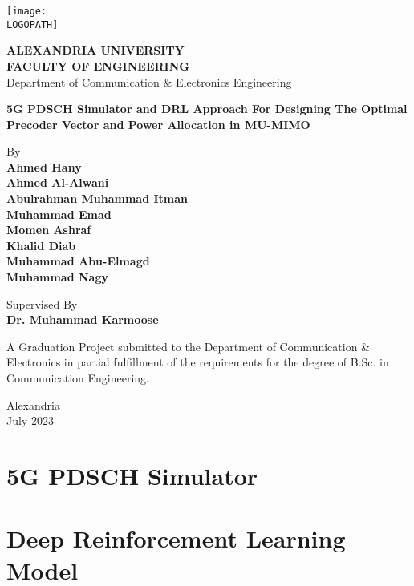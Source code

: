 \documentclass[12pt, a4paper, oneside]{book}
\def \LOGOPATH {au-logo1}
\def \UNIVERSITY {ALEXANDRIA UNIVERSITY}
\def \FACULTY {FACULTY OF ENGINEERING}
\def \DEPARTMENT {Department of Communication \& Electronics Engineering}
\def \PROJECTTITLE {5G PDSCH Simulator and DRL Approach For Designing The Optimal Precoder Vector and Power Allocation in MU-MIMO}
\def \SUPERVISOR {Dr. Muhammad Karmoose}
\begin{document}
\setlength{\parindent}{0em}
\setlength{\parskip}{1.5em}


\begin{titlepage}
    \centering
    \vfill
    \begin{center}
        \texttt{[image: \\LOGOPATH]}

        \vfill

        \textbf{\UNIVERSITY} \\
        \textbf{\FACULTY} \\
        \DEPARTMENT

        \vfill

        \LARGE{\textbf{\PROJECTTITLE}}
    
        \vfill
        By \\
        \textbf{Ahmed Hany} \\
        \textbf{Ahmed Al-Alwani} \\
        \textbf{Abulrahman Muhammad Itman} \\
        \textbf{Muhammad Emad} \\
        \textbf{Momen Ashraf} \\
        \textbf{Khalid Diab} \\
        \textbf{Muhammad Abu-Elmagd} \\
        \textbf{Muhammad Nagy}

        \vfill
        Supervised By \\
        \textbf{\SUPERVISOR}

        \vfill
        \large{A Graduation Project submitted to the Department of Communication \& Electronics in partial fulfillment of the requirements for the degree of B.Sc. in Communication Engineering.}

        \vspace{0.5cm}
        Alexandria\\
        July 2023
    
    \end{center}
\end{titlepage}

\setlength{\parskip}{0.75em}

\tableofcontents
\listoffigures

\setlength{\parskip}{0.8em}


\part{5G PDSCH Simulator}










\part{Deep Reinforcement Learning Model}
\end{document}
